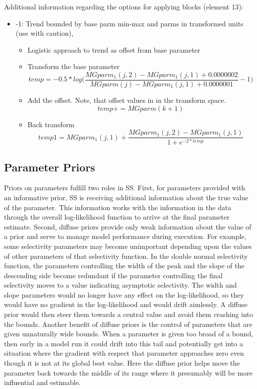 Additional information regarding the options for applying blocks (element 13):
\begin{itemize} 
	\item -1: Trend bounded by base parm min-max and parms in transformed units (use with caution),
		\begin{itemize}
			\item Logistic approach to trend as offset from base parameter
			\item Transform the base parameter
			\begin{equation}
				temp = -0.5*log\Bigg(\frac{MGparm_1(j,2)-MGparm_1(j,1)+0.0000002}{MGparm(j)-MGparm_1(j,1)+0.0000001}-1\Bigg)
			\end{equation}
			\item Add the offset.  Note, that offset values in in the transform space.
			\begin{equation}
				temp += MGparm(k+1)
			\end{equation}
			\item Back transform
			\begin{equation}
				temp1 = MGparm_1(j,1)+\frac{MGparm_1(j,2)-MGparm_1(j,1)}{1+e^{-2*temp}}
			\end{equation}			
		\end{itemize}
\end{itemize}

\hypertarget{PriorDescrip}{}
\subsection{Parameter Priors}
Priors on parameters fulfill two roles in SS.  First, for parameters provided with an informative prior, SS is receiving additional information about the true value of the parameter.  This information works with the information in the data through the overall log-likelihood function to arrive at the final parameter estimate.  Second, diffuse priors provide only weak information about the value of a prior and serve to manage model performance during execution.  For example, some selectivity parameters may become unimportant depending upon the values of other parameters of that selectivity function.  In the double normal selectivity function, the parameters controlling the width of the peak and the slope of the descending side become redundant if the parameter controlling the final selectivity moves to a value indicating asymptotic selectivity.  The width and slope parameters would no longer have any effect on the log-likelihood, so they would have no gradient in the log-likelihood and would drift aimlessly.  A diffuse prior would then steer them towards a central value and avoid them crashing into the bounds.  Another benefit of diffuse priors is the control of parameters that are given unnaturally wide bounds.  When a parameter is given too broad of a bound, then early in a model run it could drift into this tail and potentially get into a situation where the gradient with respect that parameter approaches zero even though it is not at its global best value.  Here the diffuse prior helps move the parameter back towards the middle of its range where it presumably will be more influential and estimable.  

